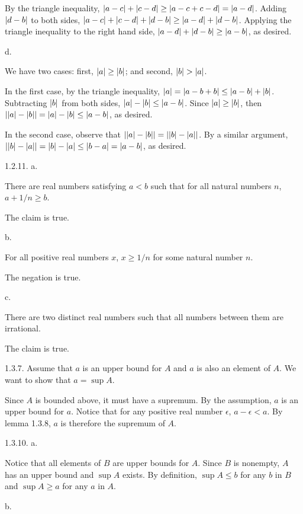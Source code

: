 By the triangle inequality,
$\vert a - c\vert + \vert c - d\vert \ge \vert a - c + c - d\vert = \vert a - d\vert$.
Adding $\vert d - b\vert$ to both sides,
$\vert a - c\vert + \vert c - d\vert + \vert d - b\vert \ge \vert a - d\vert + \vert d - b\vert$.
Applying the triangle inequality to the right hand side,
$\vert a - d\vert + \vert d - b\vert \ge \vert a - b\vert$, as desired.
\medskip
\item{} d.

We have two cases: first, $\vert a\vert \ge \vert b\vert$; and second, $\vert b\vert > \vert a\vert$.

In the first case, by the triangle inequality,
$\vert a\vert = \vert a - b + b\vert \le \vert a - b\vert + \vert b\vert$.
Subtracting $\vert b\vert$ from both sides,
$\vert a\vert - \vert b\vert \le \vert a - b\vert$.
Since $\vert a\vert \ge \vert b\vert$,
then $\vert\vert a\vert - \vert b\vert\vert = \vert a\vert - \vert b\vert \le \vert a - b\vert$, as desired.

In the second case, observe that
$\vert\vert a\vert - \vert b\vert\vert = \vert\vert b\vert - \vert a\vert\vert$.
By a similar argument,
$\vert\vert b\vert - \vert a\vert\vert = \vert b\vert - \vert a\vert \le \vert b - a\vert = \vert a - b\vert$,
as desired.
\bigskip
\item{1.2.11.} a.

There are real numbers satisfying $a < b$ such that
for all natural numbers $n$, $a + 1/n \ge b$.

The claim is true.
\medskip
\item{} b.

For all positive real numbers $x$, $x \ge 1/n$ for some natural number $n$.

The negation is true.
\medskip
\item{} c.

There are two distinct real numbers such that
all numbers between them are irrational.

The claim is true.
\bigskip
\item{1.3.7.}
Assume that $a$ is an upper bound for $A$ and $a$ is also an element of $A$.
We want to show that $a = \sup A$.

Since $A$ is bounded above, it must have a supremum.
By the assumption, $a$ is an upper bound for $a$.
Notice that for any positive real number $\epsilon$, $a - \epsilon < a$.
By lemma 1.3.8, $a$ is therefore the supremum of $A$.
\bigskip
\item{1.3.10.} a.

Notice that all elements of $B$ are upper bounds for $A$.
Since $B$ is nonempty, $A$ has an upper bound and $\sup A$ exists.
By definition, $\sup A \le b$ for any $b$ in $B$
and $\sup A \ge a$ for any $a$ in $A$.
\medskip
\item{} b.

